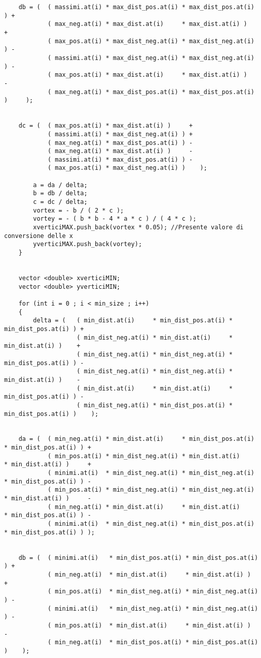\begin{verbatim}
	db = (	( massimi.at(i) * max_dist_pos.at(i) * max_dist_pos.at(i) ) +
			( max_neg.at(i) * max_dist.at(i)     * max_dist.at(i) )     +
			( max_pos.at(i) * max_dist_neg.at(i) * max_dist_neg.at(i) ) -
			( massimi.at(i) * max_dist_neg.at(i) * max_dist_neg.at(i) ) -
			( max_pos.at(i) * max_dist.at(i)     * max_dist.at(i) )     -
			( max_neg.at(i) * max_dist_pos.at(i) * max_dist_pos.at(i) ) 	);


	dc = (	( max_pos.at(i) * max_dist.at(i) )     +
			( massimi.at(i) * max_dist_neg.at(i) ) +
			( max_neg.at(i) * max_dist_pos.at(i) ) -
			( max_neg.at(i) * max_dist.at(i) )     -
			( massimi.at(i) * max_dist_pos.at(i) ) -
			( max_pos.at(i) * max_dist_neg.at(i) )	  );

		a = da / delta;
		b = db / delta;
		c = dc / delta;
		vortex = - b / ( 2 * c );
		vortey = - ( b * b - 4 * a * c ) / ( 4 * c );
		xverticiMAX.push_back(vortex * 0.05); //Presente valore di conversione delle x
		yverticiMAX.push_back(vortey); 
	}


	vector <double> xverticiMIN;
	vector <double> yverticiMIN;

	for (int i = 0 ; i < min_size ; i++)
	{
		delta = (	( min_dist.at(i)     * min_dist_pos.at(i) * min_dist_pos.at(i) ) +
					( min_dist_neg.at(i) * min_dist.at(i)     * min_dist.at(i) )    +
					( min_dist_neg.at(i) * min_dist_neg.at(i) * min_dist_pos.at(i) ) -
					( min_dist_neg.at(i) * min_dist_neg.at(i) * min_dist.at(i) )    -
					( min_dist.at(i)     * min_dist.at(i)     * min_dist_pos.at(i) ) -
					( min_dist_neg.at(i) * min_dist_pos.at(i) * min_dist_pos.at(i) )	);


	da = (	( min_neg.at(i) * min_dist.at(i)     * min_dist_pos.at(i) * min_dist_pos.at(i) ) +
			( min_pos.at(i) * min_dist_neg.at(i) * min_dist.at(i)     * min_dist.at(i) )     +
			( minimi.at(i)  * min_dist_neg.at(i) * min_dist_neg.at(i) * min_dist_pos.at(i) ) -
			( min_pos.at(i) * min_dist_neg.at(i) * min_dist_neg.at(i) * min_dist.at(i) )     -
			( min_neg.at(i) * min_dist.at(i)     * min_dist.at(i)     * min_dist_pos.at(i) ) - 
			( minimi.at(i)  * min_dist_neg.at(i) * min_dist_pos.at(i) * min_dist_pos.at(i) ) );


	db = (	( minimi.at(i)   * min_dist_pos.at(i) * min_dist_pos.at(i) ) +
			( min_neg.at(i)  * min_dist.at(i)     * min_dist.at(i) )     +
			( min_pos.at(i)  * min_dist_neg.at(i) * min_dist_neg.at(i) ) -
			( minimi.at(i)   * min_dist_neg.at(i) * min_dist_neg.at(i) ) -
			( min_pos.at(i)  * min_dist.at(i)     * min_dist.at(i) )     -
			( min_neg.at(i)  * min_dist_pos.at(i) * min_dist_pos.at(i) ) 	);



\end{verbatim}
